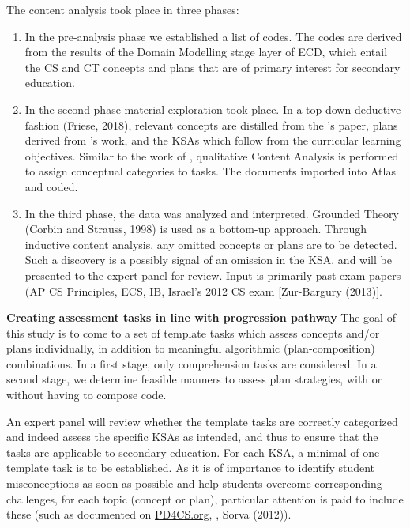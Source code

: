 The content analysis took place in three phases:
\begin{enumerate}
\item In the pre-analysis phase we established a list of codes. The codes are derived from the results of the Domain Modelling stage layer of ECD, which entail the CS and CT concepts and plans that are of primary interest for secondary education.

\item In the second phase material exploration took place. In a top-down deductive fashion (Friese, 2018), relevant concepts are distilled from the \citeauthor{LuxtonReilly2018}'s paper, plans derived from \citeauthor{deRaadt2009teachingPlans}'s work, and the KSAs which follow from the curricular learning objectives. Similar to the work of \citeauthor{LuxtonReilly2018}, qualitative Content Analysis is performed to assign conceptual categories to tasks. The documents imported into Atlas and coded.

\item In the third phase, the data was analyzed and interpreted. Grounded Theory (Corbin and Strauss, 1998) is used as a bottom-up approach. Through inductive content analysis, any omitted concepts or plans are to be detected. Such a discovery is a possibly signal of an omission in the KSA, and will be presented to the expert panel for review. Input is primarily past exam papers (AP CS Principles, ECS, IB, Israel's 2012 CS exam [Zur-Bargury (2013)].


\end{enumerate}


\noindent \textbf{Creating assessment tasks in line with progression pathway}\newline
The goal of this study is to come to a set of template tasks which assess concepts and/or plans individually, in addition to meaningful algorithmic (plan-composition) combinations.
In a first stage, only comprehension tasks are considered.%
In a second stage, we determine feasible manners to assess plan strategies, with or without having to compose code. %



An expert panel will review whether the template tasks are correctly categorized and indeed assess the specific KSAs as intended, and thus to ensure that the tasks are applicable to secondary education. For each KSA, a minimal of one template task is to be established. As it is of importance to identify student misconceptions as soon as possible and help students overcome corresponding challenges, for each topic (concept or plan), particular attention is paid to include these (such as documented on \url{PD4CS.org}, \cite{grover2017measuring}, Sorva (2012)).

